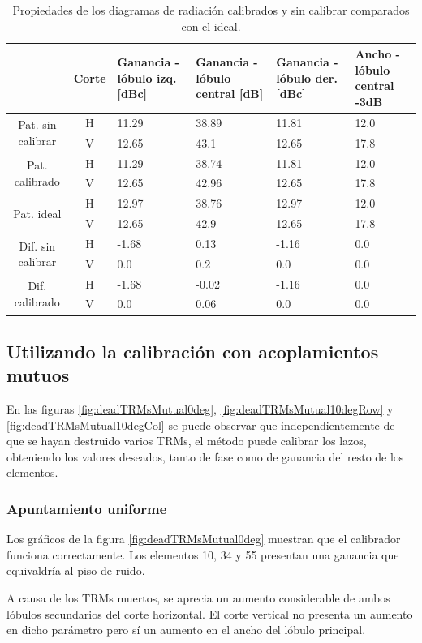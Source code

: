 \begin{table}[H]
  \footnotesize
  \centering
  \begin{tabular}{|c|c|p{2cm}|p{2.5cm}|p{2.5cm}|p{2.5cm}|}
    \cline{2-6}
    \multicolumn{1}{c|}{} & Corte & Ganancia - lóbulo izq. [dBc] & Ganancia - lóbulo central [dB] &
    Ganancia - lóbulo der. [dBc] & Ancho - lóbulo central -3dB \tabularnewline\hline
    \multirow{2}{2cm}{Pat. sin calibrar} & H & 11.29 & 38.89 & 11.81 & 12.0 \tabularnewline\cline{2-6}
     & V & 12.65 & 43.1 & 12.65 & 17.8 \tabularnewline\hline
    \multirow{2}{2cm}{Pat. calibrado} & H & 11.29 & 38.74 & 11.81 & 12.0 \tabularnewline\cline{2-6}
     & V & 12.65 & 42.96 & 12.65 & 17.8 \tabularnewline\hline
    \multirow{2}{2cm}{Pat. ideal} & H & 12.97 & 38.76 & 12.97 & 12.0 \tabularnewline\cline{2-6}
     & V & 12.65 & 42.9 & 12.65 & 17.8 \tabularnewline\hline
    \multirow{2}{2cm}{Dif. sin calibrar} & H & -1.68 & 0.13 & -1.16 & 0.0\tabularnewline\cline{2-6}
     & V & 0.0 & 0.2 & 0.0 & 0.0 \tabularnewline\hline
    \multirow{2}{2cm}{Dif. calibrado} & H & -1.68 & -0.02 & -1.16 & 0.0 \tabularnewline\cline{2-6}
     & V & 0.0 & 0.06 & 0.0 & 0.0 \tabularnewline\hline
  \end{tabular}
  \caption{Propiedades de los diagramas de radiación calibrados y sin calibrar comparados con el ideal.}
  \label{tab:deadTRMsClassical10degRow}
\end{table}


\subsection{Utilizando la calibración con acoplamientos mutuos}

En las figuras \ref{fig:deadTRMsMutual0deg}, \ref{fig:deadTRMsMutual10degRow} y  \ref{fig:deadTRMsMutual10degCol} se puede 
observar que independientemente de que se hayan destruido varios TRMs, el método puede calibrar los lazos, obteniendo los 
valores deseados, tanto de fase como de ganancia del resto de los elementos.

\subsubsection{Apuntamiento uniforme}

Los gráficos de la figura \ref{fig:deadTRMsMutual0deg} muestran que el calibrador funciona correctamente. Los elementos 10, 
34 y 55 presentan una ganancia que equivaldría al piso de ruido.

A causa de los TRMs muertos, se aprecia un aumento considerable de ambos lóbulos secundarios del corte horizontal. El corte 
vertical no presenta un aumento en dicho parámetro pero sí un aumento en el ancho del lóbulo principal.

